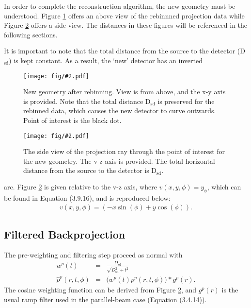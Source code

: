 \documentclass[12pt]{article}
\newcommand{\infig}[2][] {\texttt{[image: fig/\#2.pdf]}}
\begin{document}
In order to complete the reconstruction algorithm, the new geometry must be
understood.  Figure \ref{fig:above} offers an above view of the rebinnned
projection data while Figure \ref{fig:side} offers a side view.  The distances
in these figures will be referenced in the following sections.

It is important to note that the total distance from the source to the
detector (D$_\mathrm{sd}$) is kept constant.  As a result, the `new' detector
has an inverted



\begin{figure}[tbh]
\centering
\infig[width=0.98\linewidth]{officialAbove}
\caption{New geometry after rebinning. View is from above, and the x-y axis is provided. Note that the 
total distance D$_\mathrm{sd}$ is preserved for the rebinned data, which causes the new detector 
to curve outwards. Point of interest is the black dot.}
\label{fig:above}
\end{figure}

\begin{figure}[tbh]
\centering
\infig[scale=0.6]{officialSide}
\caption{The side view of the projection ray through the point of interest for the new geometry. The v-z axis is provided. The
total horizontal distance from the source to the detector is D$_\mathrm{sd}$.}
\label{fig:side}
\end{figure}
\clearpage 
\noindent arc. Figure \ref{fig:side} is given relative to the v-z
axis, where $v(x,y,\phi) = y_\phi$, which can be found in Equation (3.9.16), and is reproduced below:
\begin{eqnarray*}
v(x,y,\phi) = (-x \sin(\phi) + y \cos(\phi)).
\end{eqnarray*} 

\subsection{Filtered Backprojection}

The pre-weighting and filtering step proceed as normal with
\begin{eqnarray*}
w^p(t) &=& \frac{D_\mathrm{sd}}{\sqrt{D_\mathrm{sd}^2 + t^2}} \\
\hat{p}^p(r,t,\phi) &=& \Big(w^p(t) p^p(r,t,\phi)\Big) * g^p(r).
\end{eqnarray*}
The cosine weighting function can be derived from Figure \ref{fig:side}, and
$g^p(r)$ is the usual ramp filter used in the parallel-beam case (Equation
(3.4.14)).
\end{document}
